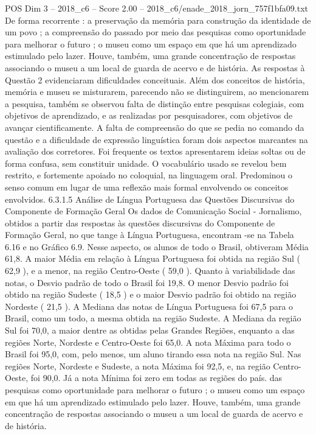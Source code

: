 \begin{textsample}{POS Dim 3 – 2018\_c6 – Score 2.00 – 2018\_c6/enade\_2018\_jorn\_757f1bfa09.txt}
De forma recorrente : a preservação da memória para construção da identidade de um povo ; a compreensão do passado por meio das pesquisas como oportunidade para melhorar o futuro ; o museu como um espaço em que há um aprendizado estimulado pelo lazer.
Houve, também, uma grande concentração de respostas associando o museu a um local de guarda de acervo e de história.
As respostas à Questão 2 evidenciaram dificuldades conceituais.
Além dos conceitos de história, memória e museu se misturarem, parecendo não se distinguirem, ao mencionarem a pesquisa, também se observou falta de distinção entre pesquisas colegiais, com objetivos de aprendizado, e as realizadas por pesquisadores, com objetivos de avançar cientificamente.
A falta de compreensão do que se pedia no comando da questão e a dificuldade de expressão linguística foram dois aspectos marcantes na avaliação dos corretores.
Foi frequente os textos apresentarem ideias soltas ou de forma confusa, sem constituir unidade.
O vocabulário usado se revelou bem restrito, e fortemente apoiado no coloquial, na linguagem oral.
Predominou o senso comum em lugar de uma reflexão mais formal envolvendo os conceitos envolvidos. 6.3.1.5 Análise de Língua Portuguesa das Questões Discursivas do Componente de Formação Geral Os dados de Comunicação Social - Jornalismo, obtidos a partir das respostas às questões discursivas do Componente de Formação Geral, no que tange à Língua Portuguesa, encontram -se na Tabela 6.16 e no Gráfico 6.9.
Nesse aspecto, os alunos de todo o Brasil, obtiveram Média 61,8.
A maior Média em relação à Língua Portuguesa foi obtida na região Sul ( 62,9 ), e a menor, na região Centro-Oeste ( 59,0 ).
Quanto à variabilidade das notas, o Desvio padrão de todo o Brasil foi 19,8.
O menor Desvio padrão foi obtido na região Sudeste ( 18,5 ) e o maior Desvio padrão foi obtido na região Nordeste ( 21,5 ).
A Mediana das notas de Língua Portuguesa foi 67,5 para o Brasil, como um todo, a mesma obtida na região Sudeste.
A Mediana da região Sul foi 70,0, a maior dentre as obtidas pelas Grandes Regiões, enquanto a das regiões Norte, Nordeste e Centro-Oeste foi 65,0.
A nota Máxima para todo o Brasil foi 95,0, com, pelo menos, um aluno tirando essa nota na região Sul.
Nas regiões Norte, Nordeste e Sudeste, a nota Máxima foi 92,5, e, na região Centro-Oeste, foi 90,0.
Já a nota Mínima foi zero em todas as regiões do país. das pesquisas como oportunidade para melhorar o futuro ; o museu como um espaço em que há um aprendizado estimulado pelo lazer.
Houve, também, uma grande concentração de respostas associando o museu a um local de guarda de acervo e de história.

\end{textsample}
